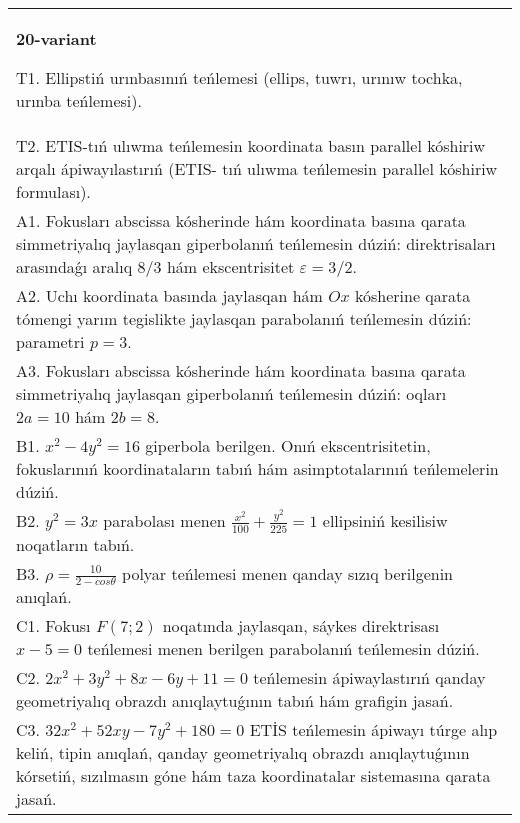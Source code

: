 \documentclass{article}
\begin{document}
\begin{tabular}{m{17cm}}
\textbf{20-variant}
\newline

T1. Ellipstiń urınbasınıń teńlemesi (ellips, tuwrı, urınıw tochka, urınba teńlemesi).\\

T2. ETIS-tıń ulıwma teńlemesin koordinata basın parallel kóshiriw arqalı ápiwayılastırıń (ETIS- tıń ulıwma teńlemesin parallel kóshiriw formulası).\\

A1. Fokusları abscissa kósherinde hám koordinata basına qarata simmetriyalıq jaylasqan giperbolanıń teńlemesin dúziń: direktrisaları arasındaǵı aralıq $8/3$ hám ekscentrisitet $\varepsilon=3/2$.\\

A2. Uchı koordinata basında jaylasqan hám $Ox$ kósherine qarata tómengi yarım tegislikte jaylasqan parabolanıń teńlemesin dúziń: parametri $p=3$.\\

A3. Fokusları abscissa kósherinde hám koordinata basına qarata simmetriyalıq jaylasqan giperbolanıń teńlemesin dúziń: oqları $2 a=10$ hám $2 b=8$.\\

B1. $x^{2} - 4y^{2} = 16$ giperbola berilgen. Onıń ekscentrisitetin, fokuslarınıń koordinataların tabıń hám asimptotalarınıń teńlemelerin dúziń.\\

B2. $y^{2} = 3x$ parabolası menen $\frac{x^{2}}{100} + \frac{y^{2}}{225} = 1$ ellipsiniń kesilisiw noqatların tabıń.  \\

B3. $\rho = \frac{10}{2 - cos\theta}$ polyar teńlemesi menen qanday sızıq berilgenin anıqlań.  \\

C1. Fokusı $F(7;2)$ noqatında jaylasqan, sáykes direktrisası $x - 5 = 0$ teńlemesi menen berilgen parabolanıń teńlemesin dúziń.  \\

C2. $2x^{2} + 3y^{2} + 8x - 6y + 11 = 0$ teńlemesin ápiwaylastırıń qanday geometriyalıq obrazdı anıqlaytuǵının tabıń hám grafigin jasań.\\

C3. $32x^{2} + 52xy - 7y^{2} + 180 = 0$ ETİS teńlemesin ápiwayı túrge alıp keliń, tipin anıqlań, qanday geometriyalıq obrazdı anıqlaytuǵının kórsetiń, sızılmasın góne hám taza koordinatalar sistemasına qarata jasań.  \\

\end{tabular}
\vspace{1cm}
\end{document}
